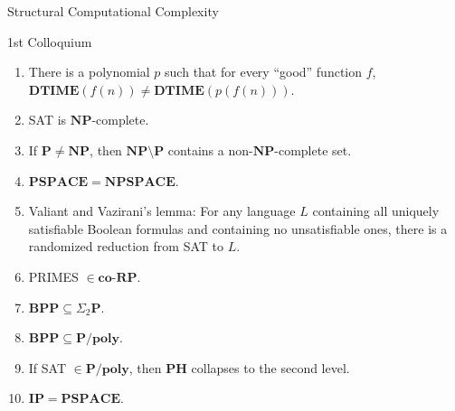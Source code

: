 \documentclass[11pt,a4paper]{article}
\newcommand{\class}[1]{\mathbf{#1}}
\renewcommand{\P}{\class{P}}
\newcommand{\NP}{\class{NP}}
\newcommand{\PSPACE}{\class{PSPACE}}
\newcommand{\NPSPACE}{\class{NPSPACE}}
\newcommand{\coRP}{\class{co\mbox{-}RP}}
\newcommand{\BPP}{\class{BPP}}
\newcommand{\Ppoly}{\class{P/poly}}
\newcommand{\PH}{\class{PH}}
\newcommand{\IP}{\class{IP}}
\newcommand{\DTIME}{\mathbf{DTIME}}
\begin{document}
\thispagestyle{empty}
\centerline{\Large Structural Computational Complexity}
\centerline{\small 1st Colloquium}
\begin{enumerate}
\item There is a polynomial $p$ such that for every ``good'' function $f$,  
      $\DTIME(f(n)) \neq \DTIME(p(f(n)))$.
\item SAT is $\NP$-complete.
\item If $\P\neq \NP$, then $\NP\setminus \P$ contains a non-$\NP$-complete set.
\item $\PSPACE=\NPSPACE$.
\item Valiant and Vazirani's lemma:
      For any language $L$ containing all uniquely satisfiable Boolean formulas
      and containing no unsatisfiable ones, 
      there is a randomized reduction from SAT to $L$.
\item PRIMES $\in \coRP$.
\item $\BPP\subseteq\Sigma_2\P$.
\item $\BPP\subseteq\Ppoly$.
\item If SAT $\in \Ppoly$, then $\PH$ collapses to the second level.
\item $\IP=\PSPACE$.
\end{enumerate}
\end{document}
